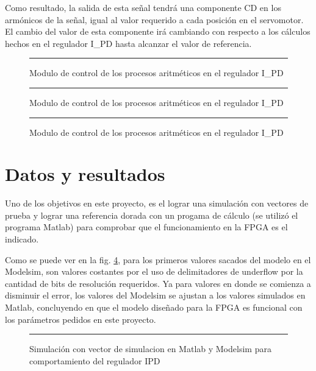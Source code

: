 \documentclass[12pt,a4paper]{article} %
\begin{document}
Como resultado, la salida de esta señal tendrá una componente CD en los armónicos de la señal, igual al valor requerido a cada posición en el servomotor. El cambio del valor de esta componente irá cambiando con respecto a los cálculos hechos en el regulador I\_PD hasta alcanzar el valor de referencia.

\begin{figure}[htbp]
  \centering
    \rule{35em}{0.3pt}
  \caption[DelPWM]{Modulo de control de los procesos aritméticos en el regulador I\_PD}
  \label{fig:DelPWM}
\end{figure}

\begin{figure}[htbp]
  \centering
    \rule{35em}{0.3pt}
  \caption[CompPWM]{Modulo de control de los procesos aritméticos en el regulador I\_PD}
  \label{fig:CompPWM}
\end{figure}

\begin{figure}[htbp]
  \centering
    \rule{35em}{0.3pt}
  \caption[10k]{Modulo de control de los procesos aritméticos en el regulador I\_PD}
  \label{fig:10k}
\end{figure}

\section{Datos y resultados}

Uno de los objetivos en este proyecto, es el lograr una simulación con vectores de prueba y lograr una referencia dorada con un progama de cálculo (se utilizó el programa Matlab) para comprobar que el funcionamiento en la FPGA es el indicado.

Como se puede ver en la fig. \ref{fig:Matlab}, para los primeros valores sacados del modelo en el Modelsim, son valores costantes por el uso de delimitadores de underflow por la cantidad de bits de resolución requeridos. Ya para valores en donde se comienza a disminuir el error, los valores del Modelsim se ajustan a los valores simulados en Matlab, concluyendo en que el modelo diseñado para la FPGA es funcional con los parámetros pedidos en este proyecto.

\begin{figure}[htbp]
  \centering
    \rule{35em}{0.3pt}
  \caption[Matlab]{Simulación con vector de simulacion en Matlab y Modelsim para comportamiento del regulador IPD}
  \label{fig:Matlab}
\end{figure}
\end{document}

